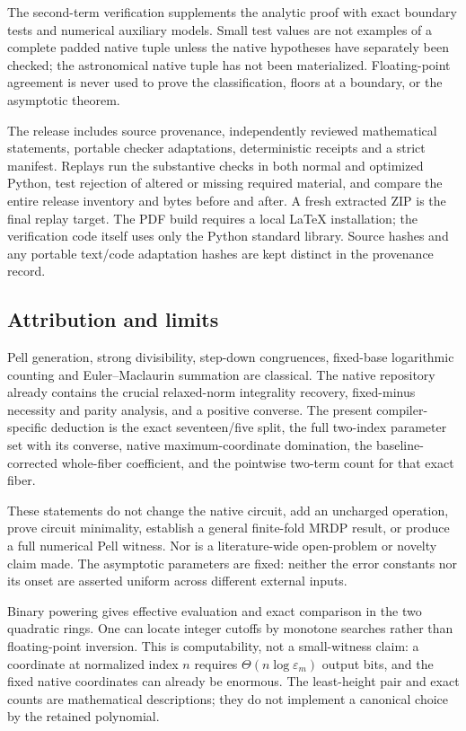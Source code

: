 \documentclass[11pt,letterpaper]{article}
\theoremstyle{definition}\newtheorem{definition}[theorem]{Definition}
\theoremstyle{remark}\newtheorem{remark}[theorem]{Remark}
\begin{document}
The second-term verification supplements the analytic proof with exact boundary tests and numerical auxiliary models. Small test values are not examples of a complete padded native tuple unless the native hypotheses have separately been checked; the astronomical native tuple has not been materialized. Floating-point agreement is never used to prove the classification, floors at a boundary, or the asymptotic theorem.

The release includes source provenance, independently reviewed mathematical statements, portable checker adaptations, deterministic receipts and a strict manifest. Replays run the substantive checks in both normal and optimized Python, test rejection of altered or missing required material, and compare the entire release inventory and bytes before and after. A fresh extracted ZIP is the final replay target. The PDF build requires a local LaTeX installation; the verification code itself uses only the Python standard library. Source hashes and any portable text/code adaptation hashes are kept distinct in the provenance record.

\subsection{Attribution and limits}
Pell generation, strong divisibility, step-down congruences, fixed-base logarithmic counting and Euler--Maclaurin summation are classical. The native repository already contains the crucial relaxed-norm integrality recovery, fixed-minus necessity and parity analysis, and a positive converse. The present compiler-specific deduction is the exact seventeen/five split, the full two-index parameter set with its converse, native maximum-coordinate domination, the baseline-corrected whole-fiber coefficient, and the pointwise two-term count for that exact fiber.

These statements do not change the native circuit, add an uncharged operation, prove circuit minimality, establish a general finite-fold MRDP result, or produce a full numerical Pell witness. Nor is a literature-wide open-problem or novelty claim made. The asymptotic parameters are fixed: neither the error constants nor its onset are asserted uniform across different external inputs.

Binary powering gives effective evaluation and exact comparison in the two quadratic rings. One can locate integer cutoffs by monotone searches rather than floating-point inversion. This is computability, not a small-witness claim: a coordinate at normalized index $n$ requires $\Theta(n\log\varepsilon_m)$ output bits, and the fixed native coordinates can already be enormous. The least-height pair and exact counts are mathematical descriptions; they do not implement a canonical choice by the retained polynomial.
\end{document}
